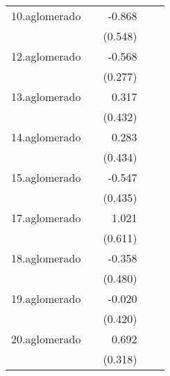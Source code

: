 {\begin{longtable}{l*{4}{D{.}{.}{-1}}}
\addlinespace
10.aglomerado&                     &      -0.868         &                     &                     \\
            &                     &     (0.548)         &                     &                     \\
\addlinespace
12.aglomerado&                     &      -0.568\sym{*}  &                     &                     \\
            &                     &     (0.277)         &                     &                     \\
\addlinespace
13.aglomerado&                     &       0.317         &                     &                     \\
            &                     &     (0.432)         &                     &                     \\
\addlinespace
14.aglomerado&                     &       0.283         &                     &                     \\
            &                     &     (0.434)         &                     &                     \\
\addlinespace
15.aglomerado&                     &      -0.547         &                     &                     \\
            &                     &     (0.435)         &                     &                     \\
\addlinespace
17.aglomerado&                     &       1.021         &                     &                     \\
            &                     &     (0.611)         &                     &                     \\
\addlinespace
18.aglomerado&                     &      -0.358         &                     &                     \\
            &                     &     (0.480)         &                     &                     \\
\addlinespace
19.aglomerado&                     &      -0.020         &                     &                     \\
            &                     &     (0.420)         &                     &                     \\
\addlinespace
20.aglomerado&                     &       0.692\sym{*}  &                     &                     \\
            &                     &     (0.318)         &                     &                     \\

\end{longtable}}
